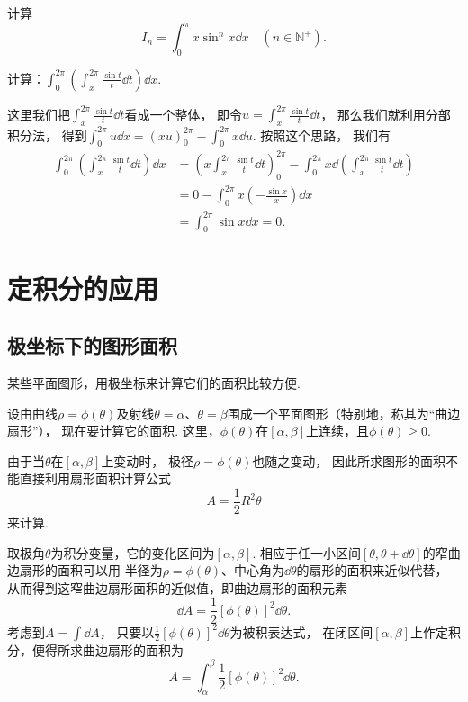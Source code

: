 \begin{example}
计算\[
	I_n = \int_0^\pi x \sin^n x \dd{x}
	\quad(n\in\mathbb{N}^+).
\]
\end{example}

\begin{example}
计算：\(\int_0^{2\pi}\left(\int_x^{2\pi}\frac{\sin t}{t}\dd{t}\right)\dd{x}\).
\begin{solution}
这里我们把\(\int_x^{2\pi}\frac{\sin t}{t}\dd{t}\)看成一个整体，
即令\(u = \int_x^{2\pi}\frac{\sin t}{t}\dd{t}\)，
那么我们就利用分部积分法，
得到\(\int_0^{2\pi} u \dd{x} = (x u)_0^{2\pi} - \int_0^{2\pi} x \dd{u}\).
按照这个思路，
我们有\begin{align*}
	\int_0^{2\pi}\left(\int_x^{2\pi}\frac{\sin t}{t}\dd{t}\right)\dd{x}
	&= \left(x \int_x^{2\pi}\frac{\sin t}{t}\dd{t}\right)_0^{2\pi}
	- \int_0^{2\pi} x \dd(\int_x^{2\pi}\frac{\sin t}{t}\dd{t}) \\
	&= 0 - \int_0^{2\pi} x \left(-\frac{\sin x}{x}\right) \dd{x} \\
	&= \int_0^{2\pi} \sin x \dd{x} = 0.
\end{align*}
\end{solution}
\end{example}

\section{定积分的应用}
\subsection{极坐标下的图形面积}
某些平面图形，用极坐标来计算它们的面积比较方便.

设由曲线\(\rho = \phi(\theta)\)及射线\(\theta=\alpha\)、\(\theta=\beta\)围成一个平面图形（特别地，称其为“曲边扇形”），
现在要计算它的面积.
这里，\(\phi(\theta)\)在\([\alpha,\beta]\)上连续，且\(\phi(\theta)\geq0\).

由于当\(\theta\)在\([\alpha,\beta]\)上变动时，
极径\(\rho=\phi(\theta)\)也随之变动，
因此所求图形的面积不能直接利用扇形面积计算公式\[
    A = \frac{1}{2} R^2 \theta
\]来计算.

取极角\(\theta\)为积分变量，它的变化区间为\([\alpha,\beta]\).
相应于任一小区间\([\theta,\theta+\dd{\theta}]\)的窄曲边扇形的面积可以用
半径为\(\rho=\phi(\theta)\)、中心角为\(\dd{\theta}\)的扇形的面积来近似代替，
从而得到这窄曲边扇形面积的近似值，即曲边扇形的面积元素\[
    \dd{A}
    = \frac{1}{2} [\phi(\theta)]^2 \dd{\theta}.
\]
考虑到\(A = \int \dd{A}\)，
只要以\(\frac{1}{2} [\phi(\theta)]^2 \dd{\theta}\)为被积表达式，
在闭区间\([\alpha,\beta]\)上作定积分，便得所求曲边扇形的面积为\[
A = \int_\alpha^\beta \frac{1}{2} [\phi(\theta)]^2 \dd{\theta}.
\]

